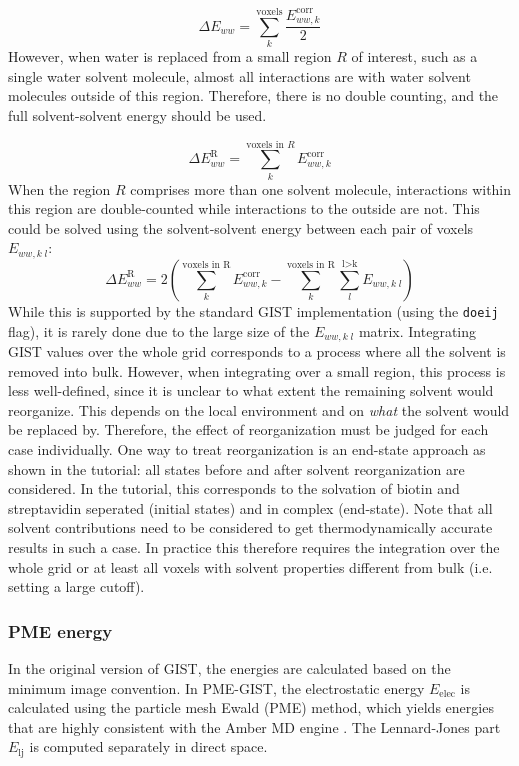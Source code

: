 \documentclass[9pt,tutorial]{livecoms}
\newcommand\inlinecode{\texttt}
\begin{document}
\begin{equation}
	\Delta E_{ww} = \sum_{k}^\text{voxels} \frac{E_{ww,k}^\text{corr}}{2}
\end{equation}
However, when water is replaced from a small region $R$ of interest, such as a single water solvent molecule, almost all interactions are with water solvent molecules outside of this region.
Therefore, there is no double counting, and the full solvent-solvent energy should be used.

\begin{equation}
	\Delta E^\text{R}_{ww} = \sum_{k}^{\text{voxels in }R} E_{ww,k}^\text{corr}
\end{equation}
When the region $R$ comprises more than one solvent molecule, interactions within this region are double-counted while interactions to the outside are not.
This could be solved using the solvent-solvent energy between each pair of voxels $E_{ww,k\;l}$:
\begin{equation}
	\Delta E^\text{R}_{ww} = 2\left(\sum_{k}^\text{voxels in R} E_{ww,k}^\text{corr}-\sum_{k}^\text{voxels in R}\sum_{l}^\text{l>k} E_{ww, k\;l}\right)
\end{equation}
While this is supported by the standard GIST implementation (using the \inlinecode{doeij} flag), it is rarely done due to the large size of the $E_{ww,k\;l}$ matrix.
Integrating GIST values over the whole grid corresponds to a process where all the solvent is removed into bulk.
However, when integrating over a small region, this process is less well-defined, since it is unclear to what extent the remaining solvent would reorganize.
This depends on the local environment and on \emph{what} the solvent would be replaced by.
Therefore, the effect of reorganization must be judged for each case individually.
One way to treat reorganization is an end-state approach as shown in the tutorial: all states before and after solvent reorganization are considered. In the tutorial, this corresponds to the solvation of biotin and streptavidin seperated (initial states) and in complex (end-state). Note that all solvent contributions need to be considered to get thermodynamically accurate results in such a case. In practice this therefore requires the integration over the whole grid or at least all voxels with solvent properties different from bulk (i.e. setting a large cutoff).
\subsubsection{PME energy}
In the original version of GIST, the energies are calculated based on the minimum image convention.
In PME-GIST, the electrostatic energy $E_\text{elec}$ is calculated using the particle mesh Ewald (PME) method, which yields energies that are highly consistent with the Amber MD engine \cite{Chen2021}.
The Lennard-Jones part $E_\text{lj}$ is computed separately in direct space.
\end{document}
